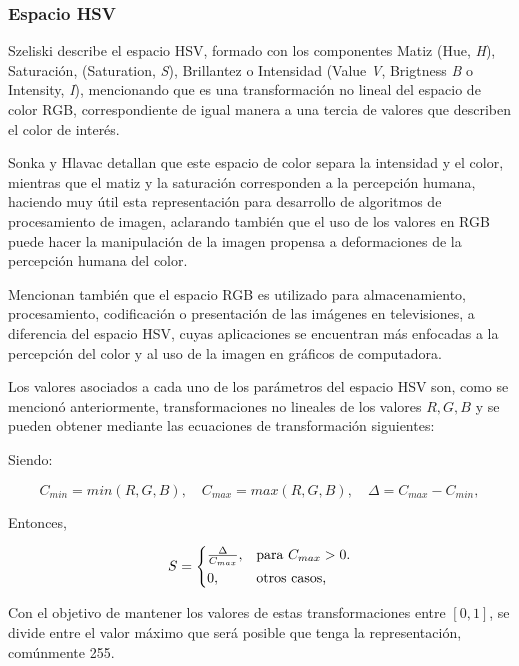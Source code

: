 \subsubsection{Espacio HSV}
Szeliski describe el espacio HSV, formado con los componentes Matiz (Hue, \textit{H}), Saturación, (Saturation, \textit{S}), Brillantez o Intensidad (Value \textit{V}, Brigtness \textit{B} o Intensity, \textit{I}), mencionando que es una transformación no lineal del espacio de color RGB, correspondiente de igual manera a una tercia de valores que describen el color de interés.

Sonka y Hlavac \cite{czerwinski_definitions_2013} detallan que este espacio de color separa la intensidad y el color, mientras que el matiz y la saturación corresponden a la percepción humana, haciendo muy útil esta representación para desarrollo de algoritmos de procesamiento de imagen, aclarando también que el uso de los valores en RGB puede hacer la manipulación de la imagen propensa a deformaciones de la percepción humana del color. 

Mencionan también que el espacio RGB es utilizado para almacenamiento, procesamiento, codificación o presentación de las imágenes en televisiones, a diferencia del espacio HSV, cuyas aplicaciones se encuentran más enfocadas a la percepción del color y al uso de la imagen en gráficos de computadora.

Los valores asociados a cada uno de los parámetros del espacio HSV son, como se mencionó anteriormente, transformaciones no lineales de los valores  $R,G,B$ y se pueden obtener mediante las ecuaciones de transformación siguientes\cite{burger_digital_2022}:

Siendo:

\begin{equation*}
C_{min} = min(R,G,B), \quad
C_{max} = max(R,G,B), \quad
\Delta = C_{max} - C_{min},
\end{equation*}

Entonces,

\begin{equation*}
    S = \begin{cases*}
  \frac{\Delta}{C_{max}}, & para $C_{max} > 0$.\\
  0, & otros casos,
    \end{cases*}
\end{equation*}

Con el objetivo de mantener los valores de estas transformaciones entre $[0,1]$, se divide entre el valor máximo que será posible que tenga la representación, comúnmente 255.

